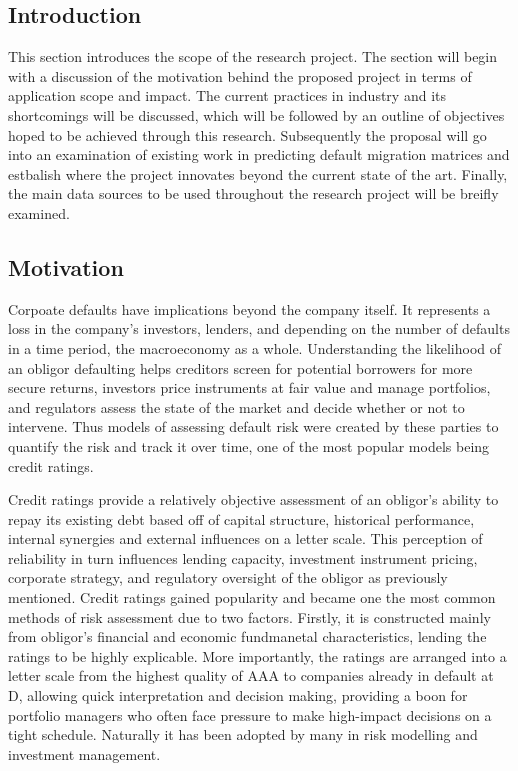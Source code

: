 \documentclass[10pt]{article}
\begin{document}
\begin{multicols*}{2}

\section{Introduction}

This section introduces the scope of the research project. The section will begin with a discussion of the motivation behind the proposed project in terms of application scope and impact.
The current practices in industry and its shortcomings will be discussed, which will be followed by an outline of objectives hoped to be achieved through this research. 
Subsequently the proposal will go into an examination of existing work in predicting default migration matrices and estbalish where the project innovates beyond the current state of the art. 
Finally, the main data sources to be used throughout the research project will be breifly examined.  
 
\subsection{Motivation} 

Corpoate defaults have implications beyond the company itself. It represents a loss in the company's investors, lenders, and depending on the number of defaults in a time period, the macroeconomy as a whole.
Understanding the likelihood of an obligor defaulting helps creditors screen for potential borrowers for more secure returns, investors price instruments at fair value and manage portfolios, and regulators assess the state of the market and decide whether or not to intervene.
Thus models of assessing default risk were created by these parties to quantify the risk and track it over time, one of the most popular models being credit ratings.  

Credit ratings provide a relatively objective assessment of an obligor's ability to repay its existing debt based off of capital structure, historical performance, internal synergies and external influences on a letter scale.
This perception of reliability in turn influences lending capacity, investment instrument pricing, corporate strategy, and regulatory oversight of the obligor as previously mentioned. 
Credit ratings gained popularity and became one the most common methods of risk assessment due to two factors. Firstly, it is constructed mainly from obligor's financial and economic fundmanetal characteristics, lending the ratings to be highly explicable.
More importantly, the ratings are arranged into a letter scale from the highest quality of AAA to companies already in default at D, allowing quick interpretation and decision making, providing a boon for portfolio managers who often face pressure to make high-impact decisions on a tight schedule.
Naturally it has been adopted by many in risk modelling and investment management.


\end{multicols*}
\end{document}
